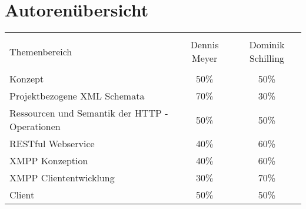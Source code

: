 
\chapter{Autorenübersicht}

\begin{table}[H]

\centering
\begin{tabular}{l c c}
\\ [-0.5ex]
\hline\hline
\\ [-0.5ex]
Themenbereich & Dennis Meyer & Dominik Schilling
\\ [1.5ex]
\hline
\\ [-0.5ex]
Konzept & 50\% & 50\% \\[1ex]
Projektbezogene XML Schemata & 70\% & 30\% \\[1ex]
Ressourcen und Semantik der HTTP - Operationen & 50\% & 50\% \\[1ex]
RESTful Webservice & 40\% & 60\% \\[1ex]
XMPP Konzeption & 40\% & 60\%\\[1ex]
XMPP Cliententwicklung & 30\% & 70\%\\[1ex]
Client & 50\% & 50\% \\[1ex]
\hline
\end{tabular}
\label{tab:ressourcendesserientrackers}
\end{table}
